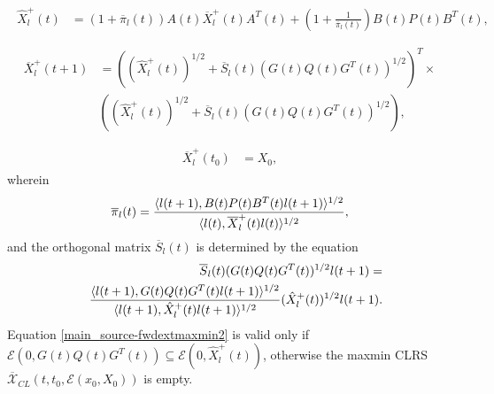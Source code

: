 \documentclass[letterpaper,10pt,english]{sphinxmanual}
\begin{document}
\label{main_source:equation-fwdextmaxmin1}\begin{gather}
\begin{split}\hat{X}^+_l(t) & = (1+\overline{\pi}_l(t))A(t)\overline{X}^+_l(t)A^T(t) +
\left(1+\frac{1}{\overline{\pi}_l(t)}\right)
B(t)P(t)B^T(t),  \\\end{split}\label{main_source-fwdextmaxmin1}
\end{gather}\label{main_source:equation-fwdextmaxmin2}\begin{gather}
\begin{split}\overline{X}^+_l(t+1) & = \left((\hat{X}^+_l(t))^{1/2} +
\overline{S}_l(t)(G(t)Q(t)G^T(t))^{1/2}\right)^T
\times \nonumber \\
& \left((\hat{X}^+_l(t))^{1/2} + \overline{S}_l(t)(G(t)Q(t)G^T(t))^{1/2}\right),\\\end{split}\label{main_source-fwdextmaxmin2}
\end{gather}\label{main_source:equation-fwdextmaxmin3}\begin{gather}
\begin{split}\overline{X}^+_l(t_0) & = X_0,\end{split}\label{main_source-fwdextmaxmin3}
\end{gather}
wherein
\begin{gather}
\begin{split}\overline{\pi}_l(t) = \frac{\langle l(t+1),
B(t)P(t)B^T(t)l(t+1)\rangle^{1/2}}{\langle l(t),
\overline{X}^+_l(t)l(t)\rangle^{1/2}},\end{split}\notag
\end{gather}
and the orthogonal matrix $\overline{S}_l(t)$ is determined by
the equation
\begin{gather}
\begin{split}\begin{aligned}
& & \overline{S}_l(t)(G(t)Q(t)G^T(t))^{1/2}l(t+1) = \\
& & \frac{\langle l(t+1),
G(t)Q(t)G^T(t)l(t+1)\rangle^{1/2}}{\langle l(t+1),
\hat{X}^+_l(t)l(t+1)\rangle^{1/2}}(\hat{X}^+_l(t))^{1/2}l(t+1).\end{aligned}\end{split}\notag
\end{gather}
Equation \eqref{main_source-fwdextmaxmin2} is valid only if
${\mathcal E}(0,G(t)Q(t)G^T(t))\subseteq{\mathcal E}(0,\hat{X}^+_l(t))$,
otherwise the maxmin CLRS
$\overline{{\mathcal X}}_{CL}(t,t_0,{\mathcal E}(x_0,X_0))$ is
empty.
\end{document}
